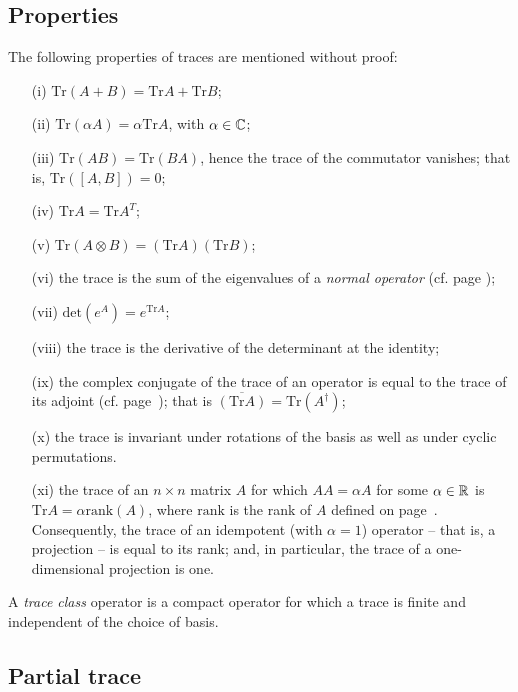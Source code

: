 \subsection{Properties}

The following properties of traces are mentioned without proof:

\begin{itemize}
\item[(i)]
$\textrm{Tr}(A+B)=\textrm{Tr}A+\textrm{Tr}B$;
\item[(ii)]
$\textrm{Tr}(\alpha A)= \alpha \textrm{Tr}A$, with $\alpha \in {\Bbb C}$;
\item[(iii)]
$\textrm{Tr}(AB) = \textrm{Tr}(BA)$, hence the trace of the  commutator vanishes; that
is, $\textrm{Tr}([A,B])=0$;
\item[(iv)]
$\textrm{Tr}A = \textrm{Tr}A^T$;
\item[(v)]
$\textrm{Tr}(A\otimes B)= (\textrm{Tr}A) (\textrm{Tr}B)$;
\item[(vi)]
the trace is the sum of the eigenvalues of a {\em normal operator} (cf. page \pageref{2014-m-fdvs-normality});
\item[(vii)]
$ \textrm{det}(e^A)=e^{\textrm{Tr}A} $;
\item[(viii)]
 the trace is the derivative of the determinant at the identity;
\item[(ix)]
the complex conjugate of the trace of an operator is equal to the trace of its adjoint
(cf. page~\pageref{2014-m-fdvs-adjoint}); that is
$\overline{(  \textrm{Tr} A)}=\textrm{Tr} (A^\dagger)$;
\item[(x)]
the trace is invariant under rotations of the basis as well as
under cyclic permutations.
\item[(xi)]
the trace of an $n \times n$ matrix $A$ for which $AA=\alpha A$ for some $\alpha \in {\Bbb R}$ is
$ \textrm{Tr} A =
\alpha \textrm{rank}(A)$,
where  $\textrm{rank}$ is the rank of $A$ defined on page~\pageref{2014-m-fdvs-rank}.
Consequently, the trace of an idempotent (with $\alpha=1$) operator -- that is, a projection --
is equal to its rank;
and, in particular, the trace of a one-dimensional projection is one.
\end{itemize}


A {\em trace class} operator is a compact operator for which a trace is finite and independent of the choice of basis.

\subsection{Partial trace}
\label{2015-partialtrace}

